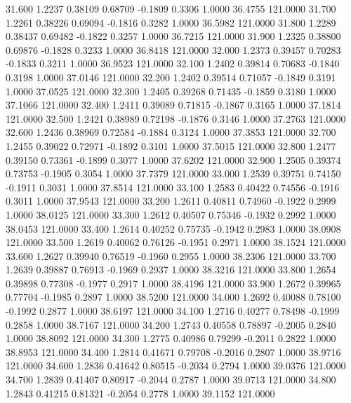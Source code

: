   31.600   1.2237   0.38109   0.68709  -0.1809   0.3306   1.0000  36.4755 121.0000
  31.700   1.2261   0.38226   0.69094  -0.1816   0.3282   1.0000  36.5982 121.0000
  31.800   1.2289   0.38437   0.69482  -0.1822   0.3257   1.0000  36.7215 121.0000
  31.900   1.2325   0.38800   0.69876  -0.1828   0.3233   1.0000  36.8418 121.0000
  32.000   1.2373   0.39457   0.70283  -0.1833   0.3211   1.0000  36.9523 121.0000
  32.100   1.2402   0.39814   0.70683  -0.1840   0.3198   1.0000  37.0146 121.0000
  32.200   1.2402   0.39514   0.71057  -0.1849   0.3191   1.0000  37.0525 121.0000
  32.300   1.2405   0.39268   0.71435  -0.1859   0.3180   1.0000  37.1066 121.0000
  32.400   1.2411   0.39089   0.71815  -0.1867   0.3165   1.0000  37.1814 121.0000
  32.500   1.2421   0.38989   0.72198  -0.1876   0.3146   1.0000  37.2763 121.0000
  32.600   1.2436   0.38969   0.72584  -0.1884   0.3124   1.0000  37.3853 121.0000
  32.700   1.2455   0.39022   0.72971  -0.1892   0.3101   1.0000  37.5015 121.0000
  32.800   1.2477   0.39150   0.73361  -0.1899   0.3077   1.0000  37.6202 121.0000
  32.900   1.2505   0.39374   0.73753  -0.1905   0.3054   1.0000  37.7379 121.0000
  33.000   1.2539   0.39751   0.74150  -0.1911   0.3031   1.0000  37.8514 121.0000
  33.100   1.2583   0.40422   0.74556  -0.1916   0.3011   1.0000  37.9543 121.0000
  33.200   1.2611   0.40811   0.74960  -0.1922   0.2999   1.0000  38.0125 121.0000
  33.300   1.2612   0.40507   0.75346  -0.1932   0.2992   1.0000  38.0453 121.0000
  33.400   1.2614   0.40252   0.75735  -0.1942   0.2983   1.0000  38.0908 121.0000
  33.500   1.2619   0.40062   0.76126  -0.1951   0.2971   1.0000  38.1524 121.0000
  33.600   1.2627   0.39940   0.76519  -0.1960   0.2955   1.0000  38.2306 121.0000
  33.700   1.2639   0.39887   0.76913  -0.1969   0.2937   1.0000  38.3216 121.0000
  33.800   1.2654   0.39898   0.77308  -0.1977   0.2917   1.0000  38.4196 121.0000
  33.900   1.2672   0.39965   0.77704  -0.1985   0.2897   1.0000  38.5200 121.0000
  34.000   1.2692   0.40088   0.78100  -0.1992   0.2877   1.0000  38.6197 121.0000
  34.100   1.2716   0.40277   0.78498  -0.1999   0.2858   1.0000  38.7167 121.0000
  34.200   1.2743   0.40558   0.78897  -0.2005   0.2840   1.0000  38.8092 121.0000
  34.300   1.2775   0.40986   0.79299  -0.2011   0.2822   1.0000  38.8953 121.0000
  34.400   1.2814   0.41671   0.79708  -0.2016   0.2807   1.0000  38.9716 121.0000
  34.600   1.2836   0.41642   0.80515  -0.2034   0.2794   1.0000  39.0376 121.0000
  34.700   1.2839   0.41407   0.80917  -0.2044   0.2787   1.0000  39.0713 121.0000
  34.800   1.2843   0.41215   0.81321  -0.2054   0.2778   1.0000  39.1152 121.0000
